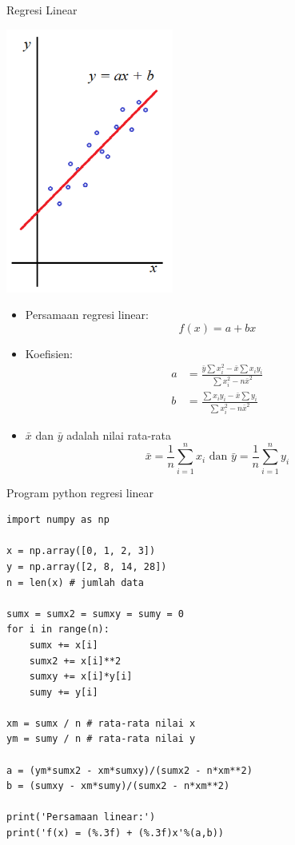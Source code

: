 \documentclass[pdflatex,compress,mathserif]{beamer}
\begin{document}
\begin{frame}{Regresi Linear}
	\begin{multicols}{2}
		\begin{center}
			\includegraphics[width=0.6\linewidth]{img/img05}
		\end{center}
		\begin{itemize}
			\item Persamaan regresi linear:
			$$ f(x) = a + bx $$
			\item Koefisien:
			\begin{align*}
				a &= \frac{\bar{y} \sum x_i^2 - \bar{x}\sum x_i y_i}{\sum x_i^2 - n\bar{x}^2} \\
				b &= \frac{\sum x_i y_i - \bar{x} \sum y_i}{\sum x_i^2 - n\bar{x}^2}
			\end{align*}
			\item $\bar{x}$ dan $\bar{y}$ adalah nilai rata-rata
			$$ \bar{x} = \frac{1}{n} \sum_{i=1}^{n} x_i \text{ dan } \bar{y} = \frac{1}{n} \sum_{i=1}^n y_i$$
		\end{itemize}
	\end{multicols}
\end{frame}

\begin{frame}[fragile]{Program python regresi linear}
	\begin{verbatim}
import numpy as np

x = np.array([0, 1, 2, 3])
y = np.array([2, 8, 14, 28])
n = len(x) # jumlah data

sumx = sumx2 = sumxy = sumy = 0
for i in range(n):
    sumx += x[i]
    sumx2 += x[i]**2
    sumxy += x[i]*y[i]
    sumy += y[i]

xm = sumx / n # rata-rata nilai x
ym = sumy / n # rata-rata nilai y

a = (ym*sumx2 - xm*sumxy)/(sumx2 - n*xm**2)
b = (sumxy - xm*sumy)/(sumx2 - n*xm**2)

print('Persamaan linear:')
print('f(x) = (%.3f) + (%.3f)x'%(a,b))
	\end{verbatim}
\end{frame}
\end{document}
